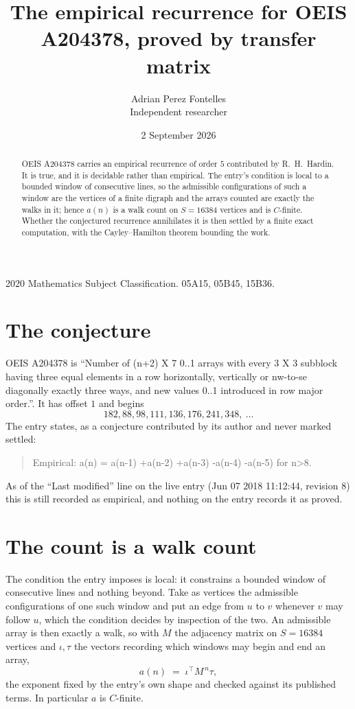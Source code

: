 \documentclass[11pt,a4paper]{article}
\title{The empirical recurrence for OEIS A204378, proved by transfer matrix}
\author{Adrian Perez Fontelles\\ \small Independent researcher}
\date{2 September 2026}
\theoremstyle{plain}
\theoremstyle{definition}
\begin{document}
\maketitle

\begin{abstract}
OEIS A204378 carries an empirical recurrence of order $5$ contributed by R.~H.~Hardin. It is
true, and it is decidable rather than empirical. The entry's condition is local to a bounded window of consecutive lines, so
the admissible configurations of such a window are the vertices of a finite digraph and the
arrays counted are exactly the walks in it; hence $a(n)$ is a walk count on $S=16384$ vertices
and is $C$-finite. Whether the conjectured recurrence annihilates it is then settled by a
finite exact computation, with the Cayley--Hamilton theorem bounding the work.
\end{abstract}

\noindent\small 2020 Mathematics Subject Classification. 05A15, 05B45, 15B36.\normalsize

\section{The conjecture}

OEIS A204378 is ``Number of (n+2) X 7 0..1 arrays with every 3 X 3 subblock having three equal elements in a row horizontally, vertically or nw-to-se diagonally exactly three ways, and new values 0..1 introduced in row major order.''. It has offset $1$ and begins
\[
182, 88, 98, 111, 136, 176, 241, 348,\ \dots
\]
The entry states, as a conjecture contributed by its author and never marked settled:
\begin{quote}
Empirical: a(n) = a(n-1) +a(n-2) +a(n-3) -a(n-4) -a(n-5) for n>8.
\end{quote}
As of the ``Last modified'' line on the live entry (Jun 07 2018 11:12:44, revision 8) this is still
recorded as empirical, and nothing on the entry records it as proved.

\section{The count is a walk count}

The condition the entry imposes is local: it constrains a bounded window of consecutive lines and nothing beyond. Take as
vertices the admissible configurations of one such window and put an edge from $u$ to $v$
whenever $v$ may follow $u$, which the condition decides by inspection of the two. An
admissible array is then exactly a walk, so with $M$ the adjacency matrix on $S=16384$ vertices
and $\iota,\tau$ the vectors recording which windows may begin and end an array,
\[
a(n)\;=\;\iota^{\!\top}M^{\,n}\tau ,
\]
the exponent fixed by the entry's own shape and checked against its published terms. In
particular $a$ is $C$-finite.
\end{document}
